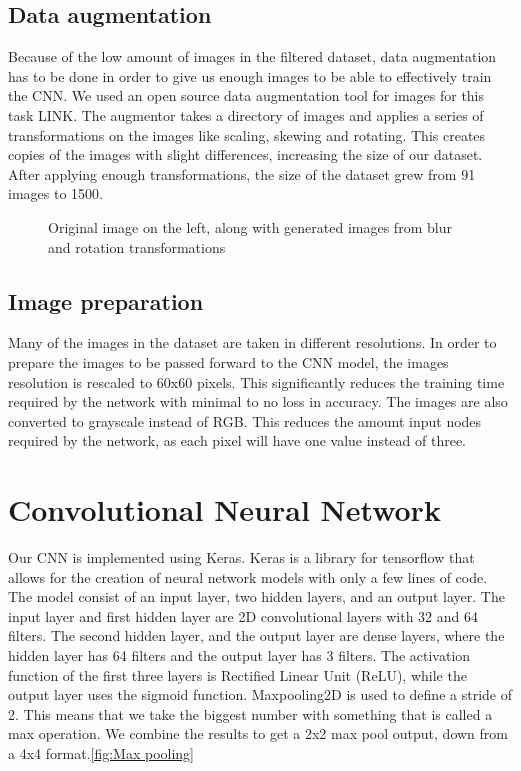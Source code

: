\subsection{Data augmentation}\label{subsec:data-augmentation}
Because of the low amount of images in the filtered dataset, data augmentation has to be done in order to give us enough images to be able to effectively train the CNN\@.
We used an open source data augmentation tool for images for this task LINK\@.
The augmentor takes a directory of images and applies a series of transformations on the images like scaling, skewing and rotating.
This creates copies of the images with slight differences, increasing the size of our dataset.
After applying enough transformations, the size of the dataset grew from 91 images to 1500.

\begin{figure}[h]
    \caption{Original image on the left, along with generated images from blur and rotation transformations}
    \label{fig:figure4.3}
\end{figure}

\subsection{Image preparation}\label{subsec:imgprep}
Many of the images in the dataset are taken in different resolutions.
In order to prepare the images to be passed forward to the CNN model, the images resolution is rescaled to 60x60 pixels.
This significantly reduces the training time required by the network with minimal to no loss in accuracy.
The images are also converted to grayscale instead of RGB\@.
This reduces the amount input nodes required by the network, as each pixel will have one value instead of three.

\section{Convolutional Neural Network}\label{sec:cnn}

Our CNN is implemented using Keras.
Keras is a library for tensorflow that allows for the creation of neural network models with only a few lines of code.
The model consist of an input layer, two hidden layers, and an output layer.
The input layer and first hidden layer are 2D convolutional layers with 32 and 64 filters.
The second hidden layer, and the output layer are dense layers, where the hidden layer has 64 filters and the output layer has 3 filters.
The activation function of the first three layers is Rectified Linear Unit (ReLU), while the output layer uses the sigmoid function.
Maxpooling2D is used to define a stride of 2.
This means that we take the biggest number with something that is called a max operation.
We combine the results to get a 2x2 max pool output, down from a 4x4 format.\ref{fig:Max pooling}

